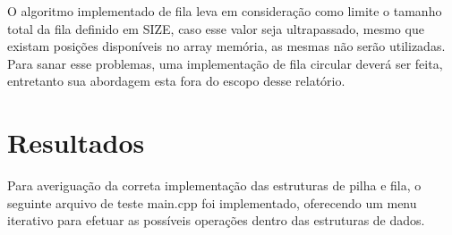 \documentclass[rascunho,xindy,sublist]{fei}
\begin{document}
O algoritmo implementado de fila leva em consideração como limite o tamanho total da fila definido em SIZE, caso esse valor seja ultrapassado, mesmo que existam posições disponíveis no array memória, as mesmas não serão utilizadas. Para sanar esse problemas, uma implementação de fila circular deverá ser feita, entretanto sua abordagem esta fora do escopo desse relatório.

\chapter{Resultados}

Para averiguação da correta implementação das estruturas de pilha e fila, o seguinte arquivo de teste main.cpp foi implementado, oferecendo um menu iterativo para efetuar as possíveis operações dentro das estruturas de dados.
\end{document}
